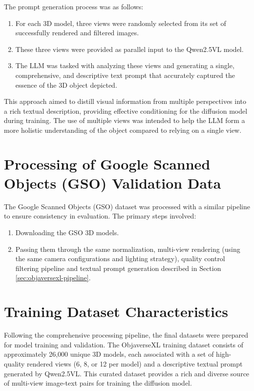 The prompt generation process was as follows:
\begin{enumerate}
  \item For each 3D model, three views were randomly selected from its set of successfully rendered and filtered images.
  \item These three views were provided as parallel input to the Qwen2.5VL model.
  \item The LLM was tasked with analyzing these views and generating a single, comprehensive, and descriptive text prompt that accurately captured the essence of the 3D object depicted.
\end{enumerate}
This approach aimed to distill visual information from multiple perspectives into a rich textual description, providing effective conditioning for the diffusion model during training. The use of multiple views was intended to help the LLM form a more holistic understanding of the object compared to relying on a single view.

\section{Processing of Google Scanned Objects (GSO) Validation Data}\label{sec:gso-processing}
The Google Scanned Objects (GSO) dataset was processed with a similar pipeline to ensure consistency in evaluation. The primary steps involved:
\begin{enumerate}
  \item Downloading the GSO 3D models.
  \item Passing them through the same normalization, multi-view rendering (using the same camera configurations and lighting strategy), quality control filtering pipeline and textual prompt generation described in Section \ref{sec:objaversexl-pipeline}.
\end{enumerate}

\section{Training Dataset Characteristics}\label{sec:final-dataset-chars}
Following the comprehensive processing pipeline, the final datasets were prepared for model training and validation.
The ObjaverseXL training dataset consists of approximately 26,000 unique 3D models, each associated with a set of high-quality rendered views (6, 8, or 12 per model) and a descriptive textual prompt generated by Qwen2.5VL. This curated dataset provides a rich and diverse source of multi-view image-text pairs for training the diffusion model.

